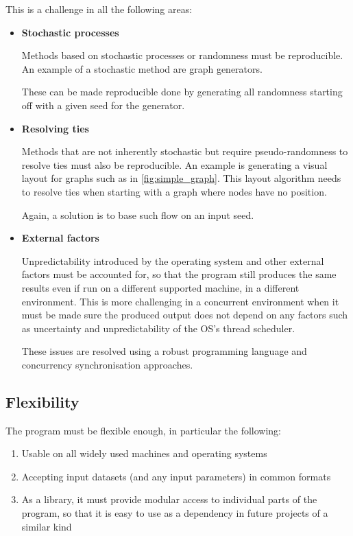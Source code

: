This is a challenge in all the following areas:
\begin{itemize}
    \item \textbf{Stochastic processes}

    Methods based on stochastic processes or randomness must be reproducible.
    An example of a stochastic method are graph generators.

    These can be made reproducible done by generating all randomness starting off with a given seed for the generator.

    \item \textbf{Resolving ties}

    Methods that are not inherently stochastic but require pseudo-randomness to resolve ties must also be reproducible.
    An example is generating a visual layout for graphs such as in \autoref{fig:simple_graph}.
    This layout algorithm needs to resolve ties when starting with a graph where nodes have no position.

    Again, a solution is to base such flow on an input seed.

    \item \textbf{External factors}

    Unpredictability introduced by the operating system and other external factors must be accounted for, so that the program still produces the same results even if run on a different supported machine, in a different environment.
    This is more challenging in a concurrent environment when it must be made sure the produced output does not depend on any factors such as uncertainty and unpredictability of the OS's thread scheduler.

    These issues are resolved using a robust programming language and concurrency synchronisation approaches.
\end{itemize}

\subsection{Flexibility}

The program must be flexible enough, in particular the following:
\begin{enumerate}
    \item Usable on all widely used machines and operating systems
    \item Accepting input datasets (and any input parameters) in common formats
    \item As a library, it must provide modular access to individual parts of the program, so that it is easy to use \graffs as a dependency in future projects of a similar kind
\end{enumerate}


